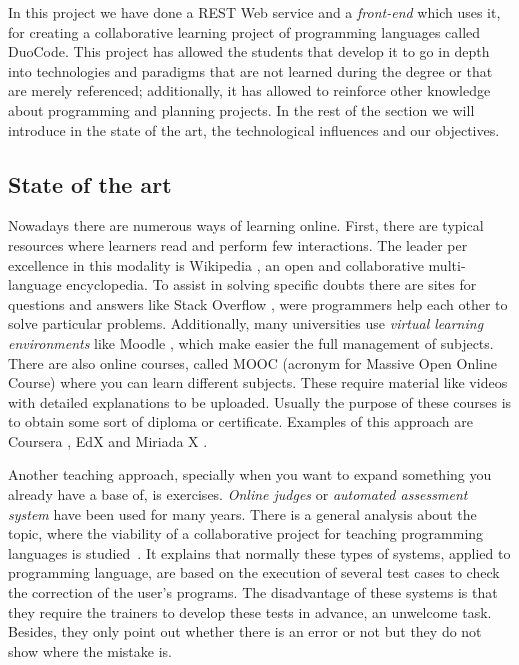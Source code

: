 
In this project we have done a REST Web service and a \emph{front-end} which uses it, for creating a collaborative learning project of programming languages called DuoCode. This project has allowed the students that develop it to go in depth into technologies and paradigms that are not learned during the degree or that are merely referenced; additionally, it has allowed to reinforce other knowledge about programming and planning projects. In the rest of the section we will introduce in the state of the art, the technological influences and our objectives.

\subsection{State of the art\label{subsec:state_art}}

Nowadays there are numerous ways of learning online. First, there are typical resources where learners read and perform few interactions. The leader per excellence in this modality is Wikipedia \cite{wiki}, an open and collaborative multi-language encyclopedia. To assist in solving specific doubts there are sites for questions and answers like Stack Overflow \cite{stack}, were programmers help each other to solve particular problems. Additionally, many universities use \emph{virtual learning environments} like Moodle \cite{moodle}, which make easier the full management of subjects. There are also online courses, called MOOC (acronym for Massive Open Online Course) where you can learn different subjects. These require material like videos with detailed explanations to be uploaded. Usually the purpose of these courses is to obtain some sort of diploma or certificate. Examples of this approach are Coursera \cite{coursera}, EdX \cite{edX} and Miriada X \cite{miriadaX}.

Another teaching approach, specially when you want to expand something you already have a base of, is exercises. \emph{Online judges} or \emph{automated assessment system} have been used for many years. There is a general analysis about the topic, where the viability of a collaborative project for teaching programming languages is studied~\cite{pimcdDuoCode14}. It explains that normally these types of systems, applied to programming language, are based on the execution of several test cases to check the correction of the user's programs. The disadvantage of these systems is that they require the trainers to develop these tests in advance, an unwelcome task. Besides, they only point out whether there is an error or not but they do not show where the mistake is.


